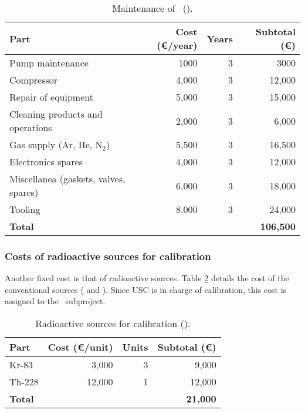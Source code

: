 \begin{table}[h!]
\begin{center}
\begin{tabular}{|l|r|r|r|}
\hline
Part & 	Cost (\euro/year)	& Years	& Subtotal (\euro) \\
\hline
Pump maintenance	& 1000	& 3	& 3000\\
Compressor              & 4,000 &	3	& 12,000 \\ 
Repair of equipment	& 5,000 &	3	&15,000 \\
Cleaning products and operations	& 2,000 &	3 & 6,000 \\
Gas supply (Ar, He, N$_2$)  & 5,500 & 	3 &	16,500 \\
Electronics spares & 4,000   & 3 & 12,000\\
Miscellanea (gaskets, valves, spares)	& 6,000 &	3 & 18,000 \\
Tooling	& 8,000 & 3 & 24,000 \\
\hline
{\bf Total} & & & {\bf 106,500}\\
\hline
\end{tabular}  
\caption{Maintenance of \Next\ (\sIFIC).}
\label{tab.main}
\end{center}
\end{table} 


\subsubsection{Costs of radioactive sources for calibration}

Another fixed cost is that of radioactive sources. Table \ref{tab.calib} details the cost of the conventional sources ( and ). Since USC is in charge of calibration, this cost is assigned to the \sUSC\ subproject.

\begin{table}[h!]
\begin{center}
\begin{tabular}{|l|r|r|r|}
\hline
Part & Cost (\euro/unit) & Units & Subtotal (\euro) \\
\hline  
Kr-83 &	3,000 &	3 & 9,000 \\
Th-228 &	12,000 & 1 & 12,000 \\
\hline
{\bf Total }   &  & &  {\bf 21,000} \\
\hline
\end{tabular}  
\caption{Radioactive sources for calibration (\sUSC).}
\label{tab.calib}
\end{center}
\end{table}

